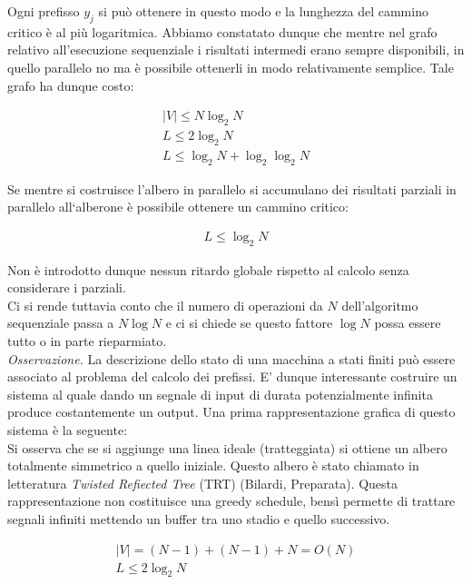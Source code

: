 \documentclass[a4paper,portrait,12pt]{article}
\theoremstyle{definition}
\providecommand{\abs}[1]{\lvert#1\rvert}
\begin{document}
Ogni prefisso $y_j$ si può ottenere in questo modo e la lunghezza del cammino critico è al più logaritmica.
Abbiamo constatato dunque che mentre nel grafo relativo all’esecuzione sequenziale i risultati intermedi erano sempre disponibili, in quello parallelo no ma è possibile ottenerli in modo relativamente semplice.
Tale grafo ha dunque costo:

\begin{gather*}
\abs{V} \le N \log_2 N\\
L \le 2 \log_2 N\\
L \le \log_2 N + \log_2\log_2 N
\end{gather*}

Se mentre si costruisce l’albero in parallelo si accumulano dei risultati parziali in parallelo all‘alberone è possibile ottenere un cammino critico:

\begin{gather*}
L \le \log_2 N
\end{gather*}

Non è introdotto dunque nessun ritardo globale rispetto al calcolo senza considerare i parziali.\\

Ci si rende tuttavia conto che il numero di operazioni da $N$ dell’algoritmo sequenziale passa a $N \log N$ e ci si chiede se questo fattore $\log N$ possa essere tutto o in parte rieparmiato.\\

\textit{Osservazione.} La descrizione dello stato di una macchina a stati finiti può essere associato al problema del calcolo dei prefissi.
E’ dunque interessante costruire un sistema al quale dando un segnale di input di durata potenzialmente infinita produce costantemente un output.
Una prima rappresentazione grafica di questo sistema è la seguente:\\

Si osserva che se si aggiunge una linea ideale (tratteggiata) si ottiene un albero totalmente simmetrico a quello iniziale.
Questo albero è stato chiamato in letteratura \textit{Twisted Refiected Tree} (TRT) (Bilardi, Preparata).
Questa rappresentazione non costituisce una greedy schedule, bensì permette di trattare segnali infiniti mettendo un buffer tra uno stadio e quello successivo.

\begin{gather*}
\abs{V} = (N - 1) + (N - 1) + N = O(N)\\
L \le 2 \log_2 N
\end{gather*}
\end{document}
